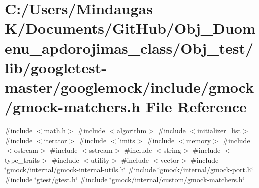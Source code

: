 \hypertarget{_obj__test_2lib_2googletest-master_2googlemock_2include_2gmock_2gmock-matchers_8h}{}\section{C\+:/\+Users/\+Mindaugas K/\+Documents/\+Git\+Hub/\+Obj\+\_\+\+Duomenu\+\_\+apdorojimas\+\_\+class/\+Obj\+\_\+test/lib/googletest-\/master/googlemock/include/gmock/gmock-\/matchers.h File Reference}
\label{_obj__test_2lib_2googletest-master_2googlemock_2include_2gmock_2gmock-matchers_8h}
{\ttfamily \#include $<$math.\+h$>$}\newline
{\ttfamily \#include $<$algorithm$>$}\newline
{\ttfamily \#include $<$initializer\+\_\+list$>$}\newline
{\ttfamily \#include $<$iterator$>$}\newline
{\ttfamily \#include $<$limits$>$}\newline
{\ttfamily \#include $<$memory$>$}\newline
{\ttfamily \#include $<$ostream$>$}\newline
{\ttfamily \#include $<$sstream$>$}\newline
{\ttfamily \#include $<$string$>$}\newline
{\ttfamily \#include $<$type\+\_\+traits$>$}\newline
{\ttfamily \#include $<$utility$>$}\newline
{\ttfamily \#include $<$vector$>$}\newline
{\ttfamily \#include \char`\"{}gmock/internal/gmock-\/internal-\/utils.\+h\char`\"{}}\newline
{\ttfamily \#include \char`\"{}gmock/internal/gmock-\/port.\+h\char`\"{}}\newline
{\ttfamily \#include \char`\"{}gtest/gtest.\+h\char`\"{}}\newline
{\ttfamily \#include \char`\"{}gmock/internal/custom/gmock-\/matchers.\+h\char`\"{}}\newline
